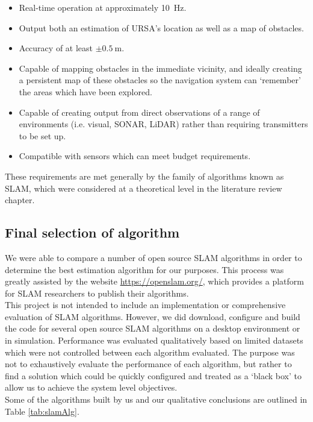 \documentclass[capstone_report.tex]{subfiles}
\begin{document}
\begin{itemize}
	\item Real-time operation at approximately \SI{10}{\hertz}.
	\item Output both an estimation of URSA's location as well as a map of obstacles.
	\item Accuracy of at least $\pm \SI{0.5}{\meter}$.
	\item Capable of mapping obstacles in the immediate vicinity, and ideally creating a persistent map of these obstacles so the navigation system can `remember' the areas which have been explored.
	\item Capable of creating output from direct observations of a range of environments (i.e. visual, SONAR, LiDAR) rather than requiring transmitters to be set up.
	\item Compatible with sensors which can meet budget requirements.
\end{itemize}

These requirements are met generally by the family of algorithms known as SLAM, which were considered at a theoretical level in the literature review chapter.

\subsection{Final selection of algorithm}
We were able to compare a number of open source SLAM algorithms in order to determine the best estimation algorithm for our purposes. This process was greatly assisted by the website \url{https://openslam.org/}, which provides a platform for SLAM researchers to publish their algorithms. \\

This project is not intended to include an implementation or comprehensive evaluation of SLAM algorithms. However, we did download, configure and build the code for several open source SLAM algorithms on a desktop environment or in simulation. Performance was evaluated qualitatively based on limited datasets which were not controlled between each algorithm evaluated. The purpose was not to exhaustively evaluate the performance of each algorithm, but rather to find a solution which could be quickly configured and treated as a `black box' to allow us to achieve the system level objectives.\\


Some of the algorithms built by us and our qualitative conclusions are outlined in Table \ref{tab:slamAlg}.
\end{document}
